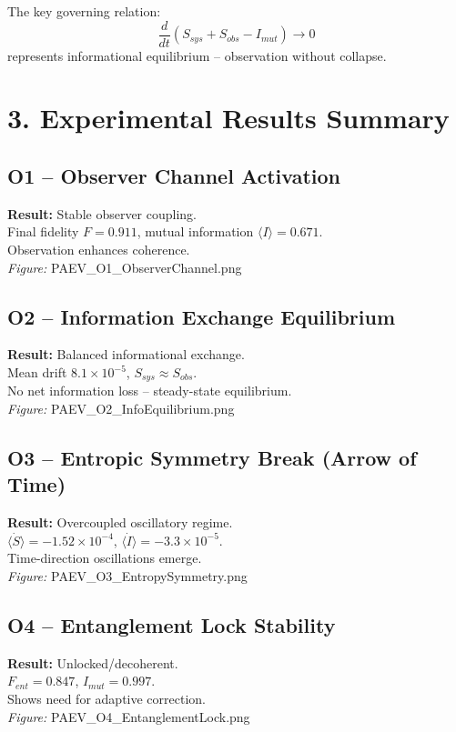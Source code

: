 \documentclass[12pt]{article}
\begin{document}
The key governing relation:
\[
\frac{d}{dt}(S_{sys} + S_{obs} - I_{mut}) \rightarrow 0
\]
represents informational equilibrium – observation without collapse.

\section*{3. Experimental Results Summary}
\subsection*{O1 – Observer Channel Activation}
\textbf{Result:} Stable observer coupling. \\
Final fidelity $F=0.911$, mutual information $\langle I \rangle=0.671$. \\
Observation enhances coherence. \\
\textit{Figure:} PAEV\_O1\_ObserverChannel.png

\subsection*{O2 – Information Exchange Equilibrium}
\textbf{Result:} Balanced informational exchange. \\
Mean drift $8.1\times10^{-5}$, $S_{sys}\approx S_{obs}$. \\
No net information loss – steady-state equilibrium. \\
\textit{Figure:} PAEV\_O2\_InfoEquilibrium.png

\subsection*{O3 – Entropic Symmetry Break (Arrow of Time)}
\textbf{Result:} Overcoupled oscillatory regime. \\
$\langle \dot{S} \rangle=-1.52\times10^{-4}$, $\langle \dot{I} \rangle=-3.3\times10^{-5}$. \\
Time-direction oscillations emerge. \\
\textit{Figure:} PAEV\_O3\_EntropySymmetry.png

\subsection*{O4 – Entanglement Lock Stability}
\textbf{Result:} Unlocked/decoherent. \\
$F_{ent}=0.847$, $I_{mut}=0.997$. \\
Shows need for adaptive correction. \\
\textit{Figure:} PAEV\_O4\_EntanglementLock.png
\end{document}
